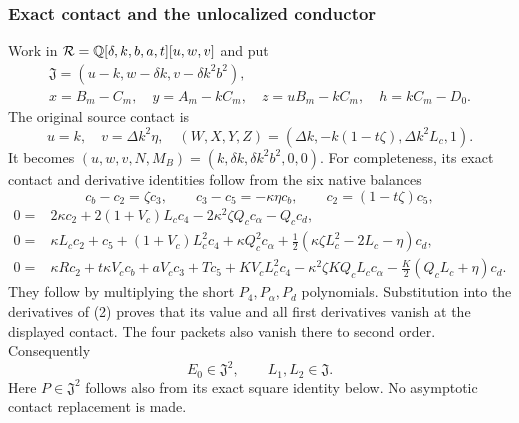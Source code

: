 \subsubsection*{Exact contact and the unlocalized conductor}

Work in $\mathcal R=\mathbb Q[\delta,k,b,a,t][u,w,v]$ and put
\[
 \begin{gathered}
 \mathfrak J=(u-k,w-\delta k,v-\delta k^2b^2),\\
 x=B_m-C_m,\quad y=A_m-kC_m,\quad z=uB_m-kC_m,
 \quad h=kC_m-D_0.
 \end{gathered}
\]
The original source contact is
\[
 u=k,\quad v=\Delta k^2\eta,\quad
 (W,X,Y,Z)=(\Delta k,-k(1-t\zeta),\Delta k^2L_c,1).
\]
It becomes $(u,w,v,N,M_B)=(k,\delta k,\delta k^2b^2,0,0)$.
For completeness, its exact contact and derivative identities follow
from the six native balances
\[
 c_b-c_2=\zeta c_3,\qquad c_3-c_5=-\kappa\eta c_b,
 \qquad c_2=(1-t\zeta)c_5,
\]
\begin{align*}
 0={}&2\kappa c_2+2(1+V_c)L_cc_4
         -2\kappa^2\zeta Q_cc_\alpha-Q_cc_d,\\
 0={}&\kappa L_cc_2+c_5+(1+V_c)L_c^2c_4+\kappa Q_c^2c_\alpha
         +\tfrac12(\kappa\zeta L_c^2-2L_c-\eta)c_d,\\
 0={}&\kappa Rc_2+t\kappa V_cc_b+aV_cc_3+Tc_5
       +KV_cL_c^2c_4-\kappa^2\zeta KQ_cL_cc_\alpha
       -\tfrac K2(Q_cL_c+\eta)c_d.
\end{align*}
They follow by multiplying the short $P_4,P_\alpha,P_d$ polynomials.
Substitution into the derivatives of (2) proves that its value and all
first derivatives vanish at the displayed contact. The four packets
also vanish there to second order. Consequently
\[
 E_0\in\mathfrak J^2,\qquad L_1,L_2\in\mathfrak J.       \tag{8}
\]
Here $P\in\mathfrak J^2$ follows also from its exact square identity
below. No asymptotic contact replacement is made.

